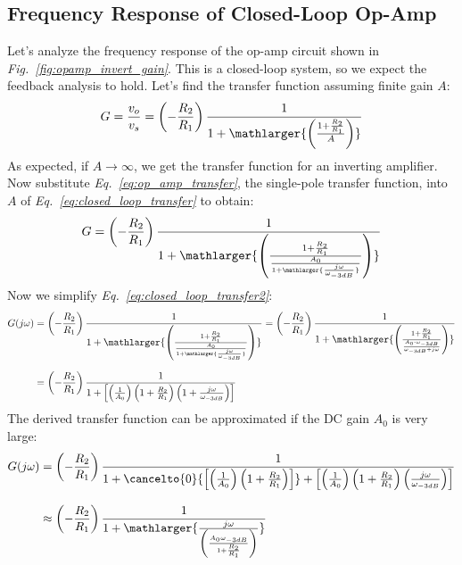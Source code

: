 \subsection{Frequency Response of Closed-Loop Op-Amp}
Let's analyze the frequency response of the op-amp circuit shown in \emph{Fig.~\ref{fig:opamp_invert_gain}}.  This is a closed-loop system, so we expect the feedback analysis to hold.  Let's find the transfer function assuming finite gain $A$:
    \begin{equation}
        G = \frac{v_o}{v_s}
        = \left(-\frac{R_2}{R_1}\right) \frac{1}
                                             {1 + \mathlarger{\left(\frac{1 + \frac{R_2}{R_1}}{A}\right)}}
        \label{eq:closed_loop_transfer}
    \end{equation}
As expected, if $A \rightarrow \infty$, we get the transfer function for an inverting amplifier.  Now substitute \emph{Eq.~\ref{eq:op_amp_transfer}}, the single-pole transfer function, into $A$ of \emph{Eq.~\ref{eq:closed_loop_transfer}} to obtain:
    \begin{equation} 
        G = \left(-\frac{R_2}{R_1}\right)
            \frac{1}{1 + \mathlarger{\left(\frac{1 + \frac{R_2}{R_1}}
                                            {\frac{A_0}{1 + \mathlarger{\frac{j\omega}{\omega_{-3dB}}}}}\right)}}
        \label{eq:closed_loop_transfer2}
    \end{equation}
Now we simplify \emph{Eq.~\ref{eq:closed_loop_transfer2}}:
    \begin{align}
        G(j\omega) &= \left(-\frac{R_2}{R_1}\right)
            \frac{1}{1 + \mathlarger{\left(\frac{1 + \frac{R_2}{R_1}}
                                            {\frac{A_0}{1 + \mathlarger{\frac{j\omega}{\omega_{-3dB}}}}}\right)}}
        =\left(-\frac{R_2}{R_1}\right)
            \frac{1}{1 + \mathlarger{\left(\frac{1 + \frac{R_2}{R_1}}
                                            {\frac{A_0 \cdot \omega_{-3dB}}{\omega_{-3dB} + j\omega}}\right)}}\\[0.25cm]
        &= \left(-\frac{R_2}{R_1}\right)  \frac{1}{1 + \left[\left(\frac{1}{A_0}\right) \left(1 + \frac{R_2}{R_1}\right)\left(1 + \frac{j\omega}{\omega_{-3dB}}\right)\right]}
    \end{align}
The derived transfer function can be approximated if the DC gain $A_0$ is very large:
    \begin{align}
        G(j\omega) &= \left(-\frac{R_2}{R_1}\right)
                        \frac{1}{1 + \cancelto{0}{\left[\left(\frac{1}{A_0}\right)
                                        \left(1 + \frac{R_2}{R_1}\right)\right]}
                                        + \left[\left(\frac{1}{A_0}\right)
                                        \left(1 + \frac{R_2}{R_1}\right)
                                            \left(\frac{j\omega}{\omega_{-3dB}}\right)\right]}\\[0.3cm]
        &\approx \left(-\frac{R_2}{R_1}\right)
                        \frac{1}{1 + \mathlarger{\frac{j\omega}{\left(\frac{A_0 \omega_{-3dB}}{1 + \frac{R_2}{R_1}}\right)}}}
    \end{align}

